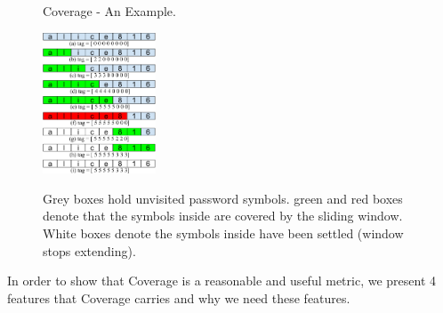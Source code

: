 \begin{figure}[h!]
\centering
  \caption{Coverage - An Example.}{}
  \label{f1}
  \centering
    \includegraphics[width=0.3\textwidth]{fig/cvgfig}
\caption*{Grey boxes hold unvisited password symbols. green and red boxes denote that the symbols inside are covered by the sliding window. White boxes denote the symbols inside have been settled (window stops extending). }

\end{figure}


In order to show that Coverage is a reasonable and useful metric, we present 4 features that Coverage carries and why we need these features.

